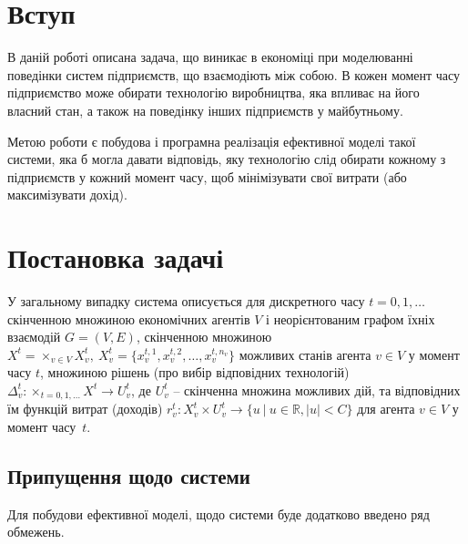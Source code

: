 \documentclass[oneside,14pt]{extarticle}
\begin{document}

\setcounter{page}{2}

\tableofcontents
\clearpage

\section{Вступ}

В даній роботі описана задача, що виникає в економіці\cite{David:1998} при моделюванні поведінки систем підприємств, що взаємодіють між собою. В кожен момент часу підприємство може обирати технологію виробництва, яка впливає на його власний стан, а також на поведінку інших підприємств у майбутньому.

Метою роботи є побудова і програмна реалізація ефективної моделі такої системи, яка б могла давати відповідь, яку технологію слід обирати кожному з підприємств у кожний момент часу, щоб мінімізувати свої витрати (або максимізувати дохід).







\section{Постановка задачі}

\label{sec:description}

У загальному випадку система описується\cite{Chornei:2005} для дискретного часу \(t = 0, 1, \ldots \) скінченною множиною економічних агентів \(V\) і неорієнтованим графом їхніх взаємодій \(G = (V, E)\), скінченною множиною \(X^t = \times_{v \in V}X_v^t,\ X_v^t = \{x^{t,1}_v, x^{t,2}_v, \ldots, x^{t,n_v}_v\}\) можливих станів агента \(v \in V\) у момент часу \(t\), множиною рішень (про вибір відповідних технологій) \(\Delta_v^t: \times_{t=0,1,\ldots}X^t \rightarrow U_v^t\), де \(U_v^t\) – скінченна множина можливих дій, та відповідних їм функцій витрат (доходів) \(r_v^t: X_v^t \times U_v^t \rightarrow \{u\ |\ u \in \mathbb{R}, |u| < C\}\) для агента \(v \in V\) у момент часу~\(t\).








\subsection{Припущення щодо системи}

Для побудови ефективної моделі, щодо системи буде додатково введено ряд обмежень.
\end{document}
